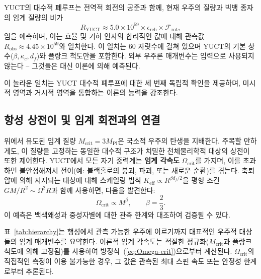 \documentclass[11pt,a4paper]{article}
\newcommand{\Keff}{K_{\mathrm{eff}}}
\begin{document}
	YUCT의 대수적 폐루프는 전역적 회전의 공준과 함께, 현재 우주의 질량과 빅뱅 종자의 임계 질량의 비가
	\[
	R_{\mathrm{YUCT}} \approx 5.0\times 10^{59} \times \epsilon_{\mathrm{reh}} \times \mathcal{F}_{\mathrm{rot}},
	\]
	임을 예측하며, 이는 효율 및 기하 인자의 합리적인 값에 대해 관측값 \(R_{\mathrm{obs}} \approx 4.45\times 10^{59}\)와 일치한다. 이 일치는 60 자릿수에 걸쳐 있으며 YUCT의 기본 상수(\(\beta, \kappa_c, d_f\))와 플랑크 척도만을 포함한다. 외부 우주론 매개변수는 입력으로 사용되지 않는다 – 그것들은 대신 이론에 의해 예측된다.
	
	이 놀라운 일치는 YUCT 대수적 폐루프에 대한 세 번째 독립적 확인을 제공하며, 미시적 영역과 거시적 영역을 통합하는 이론의 능력을 강조한다.
	
	\subsection{항성 상전이 및 임계 회전과의 연결}
	
	위에서 유도된 임계 질량 \(M_{\mathrm{crit}} = 3M_{\mathrm{Pl}}\)은 국소적 우주의 탄생을 지배한다. 주목할 만하게도, 이 질량을 고정하는 동일한 대수적 구조가 치밀한 천체물리학적 대상의 상전이 또한 제어한다. YUCT에서 모든 자기 중력계는 \textbf{임계 각속도} \(\Omega_{\mathrm{crit}}\)를 가지며, 이를 초과하면 불안정해져서 전이(예: 블랙홀로의 붕괴, 파괴, 또는 새로운 순환)를 겪는다. 축퇴압에 의해 지지되는 대상에 대해 스케일링 법칙 \(\Keff \propto R^{\beta d_f/2}\)을 평형 조건 \(GM/R^2 \sim \Omega^2 R\)과 함께 사용하면, 다음을 발견한다:
	\begin{equation}
		\Omega_{\mathrm{crit}} \propto M^{\beta}, \qquad \beta = \frac{2}{3}.
		\label{eq:Omega-crit}
	\end{equation}
	이 예측은 백색왜성과 중성자별에 대한 관측 한계와 대조하여 검증될 수 있다.
	
	표~\ref{tab:hierarchy}는 행성에서 관측 가능한 우주에 이르기까지 대표적인 우주적 대상들의 임계 매개변수를 요약한다. 이론적 임계 각속도는 적절한 정규화(\(M_{\mathrm{crit}}\)과 플랑크 척도에 의해 고정됨)를 사용하여 방정식~(\ref{eq:Omega-crit})으로부터 계산된다. \(\Omega_{\mathrm{crit}}\)의 직접적인 측정이 이용 불가능한 경우, 그 값은 관측된 최대 스핀 속도 또는 안정성 한계로부터 추론된다.
	
\end{document}
